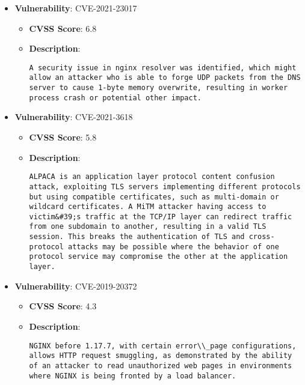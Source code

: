\documentclass{article}
\begin{document}
\begin{itemize}
        \item \textbf{Vulnerability}: CVE-2021-23017
        \begin{itemize}
            \item \textbf{CVSS Score}:  6.8 
            \item \textbf{Description}:
            \parbox[t]{0.9\linewidth}{
                \verb|A security issue in nginx resolver was identified, which might allow an attacker who is able to forge UDP packets from the DNS server to cause 1-byte memory overwrite, resulting in worker process crash or potential other impact.|
            }
        \end{itemize}
    
        \item \textbf{Vulnerability}: CVE-2021-3618
        \begin{itemize}
            \item \textbf{CVSS Score}:  5.8 
            \item \textbf{Description}:
            \parbox[t]{0.9\linewidth}{
                \verb|ALPACA is an application layer protocol content confusion attack, exploiting TLS servers implementing different protocols but using compatible certificates, such as multi-domain or wildcard certificates. A MiTM attacker having access to victim&#39;s traffic at the TCP/IP layer can redirect traffic from one subdomain to another, resulting in a valid TLS session. This breaks the authentication of TLS and cross-protocol attacks may be possible where the behavior of one protocol service may compromise the other at the application layer.|
            }
        \end{itemize}
    
        \item \textbf{Vulnerability}: CVE-2019-20372
        \begin{itemize}
            \item \textbf{CVSS Score}:  4.3 
            \item \textbf{Description}:
            \parbox[t]{0.9\linewidth}{
                \verb|NGINX before 1.17.7, with certain error\\_page configurations, allows HTTP request smuggling, as demonstrated by the ability of an attacker to read unauthorized web pages in environments where NGINX is being fronted by a load balancer.|
            }
        \end{itemize}
    

\end{itemize}
\end{document}
